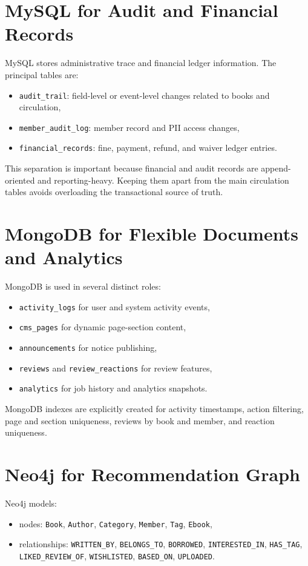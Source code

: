 \documentclass[12pt,a4paper]{report}
\begin{document}
\section{MySQL for Audit and Financial Records}
MySQL stores administrative trace and financial ledger information. The principal tables are:
\begin{itemize}[leftmargin=1.5em]
    \item \texttt{audit\_trail}: field-level or event-level changes related to books and circulation,
    \item \texttt{member\_audit\_log}: member record and PII access changes,
    \item \texttt{financial\_records}: fine, payment, refund, and waiver ledger entries.
\end{itemize}

This separation is important because financial and audit records are append-oriented and reporting-heavy. Keeping them apart from the main circulation tables avoids overloading the transactional source of truth.

\section{MongoDB for Flexible Documents and Analytics}
MongoDB is used in several distinct roles:
\begin{itemize}[leftmargin=1.5em]
    \item \texttt{activity\_logs} for user and system activity events,
    \item \texttt{cms\_pages} for dynamic page-section content,
    \item \texttt{announcements} for notice publishing,
    \item \texttt{reviews} and \texttt{review\_reactions} for review features,
    \item \texttt{analytics} for job history and analytics snapshots.
\end{itemize}

MongoDB indexes are explicitly created for activity timestamps, action filtering, page and section uniqueness, reviews by book and member, and reaction uniqueness.

\section{Neo4j for Recommendation Graph}
Neo4j models:
\begin{itemize}[leftmargin=1.5em]
    \item nodes: \texttt{Book}, \texttt{Author}, \texttt{Category}, \texttt{Member}, \texttt{Tag}, \texttt{Ebook},
    \item relationships: \texttt{WRITTEN\_BY}, \texttt{BELONGS\_TO}, \texttt{BORROWED}, \texttt{INTERESTED\_IN}, \texttt{HAS\_TAG}, \texttt{LIKED\_REVIEW\_OF}, \texttt{WISHLISTED}, \texttt{BASED\_ON}, \texttt{UPLOADED}.
\end{itemize}
\end{document}
